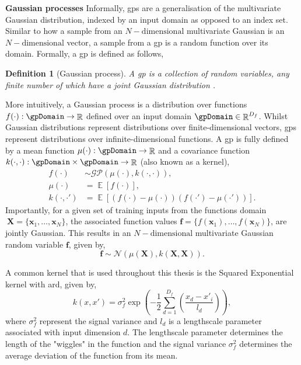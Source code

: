 \documentclass{mimosis-class/mimosis}
\newtheorem{definition}{Definition}[section]
\numberwithin{equation}{chapter}
\DeclareMathOperator{\R}{\mathbb{R}}
\DeclareMathOperator{\E}{\mathbb{E}}
\begin{document}
\textbf{Gaussian processes}
Informally, \acrshort{gps} are a generalisation of the multivariate Gaussian distribution, indexed by an
input domain as opposed to an index set.
Similar to how a sample from an \(N-\text{dimensional}\) multivariate Gaussian is an \(N-\text{dimensional}\) vector,
a sample from a \acrshort{gp} is a random function over its domain.
Formally, a \acrshort{gp} is defined as follows,
\begin{definition}[Gaussian process]
A \acrfull{gp} is a collection of random variables, any finite number of which
have a joint Gaussian distribution \citep{rasmussenGaussian2006}.
\end{definition}

More intuitively, a Gaussian process  is a distribution over functions \(f(\cdot): \gpDomain \rightarrow \R\)
defined over an input domain \(\gpDomain \in \R^{D_f}\).
Whilst Gaussian distributions represent distributions over finite-dimensional vectors, \acrshort{gps} represent
distributions over infinite-dimensional functions.
A \acrshort{gp} is fully defined by a mean function \(\mu(\cdot) : \gpDomain \rightarrow \R\) and a covariance
function \(k(\cdot, \cdot) : \gpDomain \times \gpDomain \rightarrow \R\) (also known as a kernel),
\begin{align} \label{eq-gp-mean-cov}
f(\cdot) &\sim \mathcal{GP}\left(\mu(\cdot), k(\cdot,\cdot) \right), \\
\mu(\cdot) &= \E[f(\cdot)], \\
k(\cdot, \cdot') &= \E[(f(\cdot) -\mu(\cdot)) (f(\cdot') - \mu(\cdot'))].
\end{align}
Importantly, for a given set of training inputs from the
functions domain \(~{\mathbf{X} = \{ \mathbf{x}_1, \ldots, \mathbf{x}_N \}}\), the associated function values
\(\mathbf{f} = \{f(\mathbf{x}_1), \ldots, f(\mathbf{x}_N) \}\),
are jointly Gaussian.
This results in an \(N-\text{dimensional}\) multivariate Gaussian random variable \(\mathbf{f}\), given by,
\begin{equation} \label{eq-gp-marginal}
\mathbf{f} \sim \mathcal{N}(\mu(\mathbf{X}), k(\mathbf{X}, \mathbf{X})).
\end{equation}
\begin{myquote}
A common kernel that is used throughout this thesis is the Squared Exponential
kernel with \acrfull{ard}, given by,
\begin{equation} \label{eq-se-kernel}
k(x, x') = \sigma_f^2 \exp\left(-\frac{1}{2} \sum_{d=1}^{D_f} \left( \frac{x_{d}- x'_{i}}{l_d} \right) \right),
\end{equation}
where $\sigma_f^2$ represent the signal variance and $l_d$ is a lengthscale parameter associated with
input dimension $d$.
The lengthscale parameter determines the length of the "wiggles" in the function and
the signal variance $\sigma_f^2$ determines the average deviation of the function from its mean.
\end{myquote}
\end{document}
